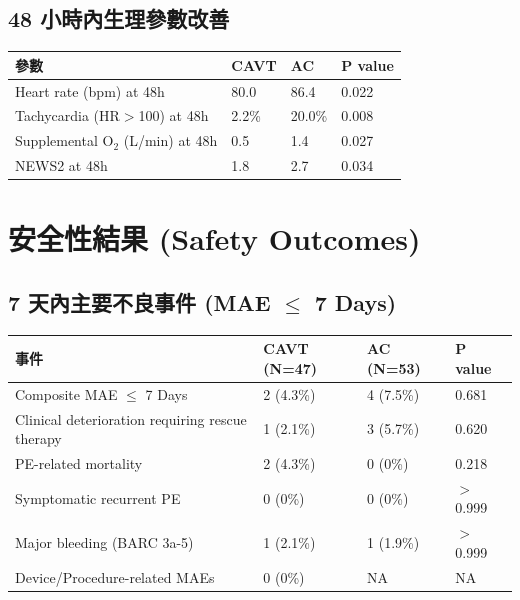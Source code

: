\documentclass[11pt,a4paper]{article}
\begin{document}
\subsection{48 小時內生理參數改善}

\begin{longtable}{p{5cm}p{3cm}p{3cm}p{2.5cm}}
\toprule
\textbf{參數} & \textbf{CAVT} & \textbf{AC} & \textbf{P value} \\
\midrule
\endfirsthead
\bottomrule
\endfoot
Heart rate (bpm) at 48h & 80.0 & 86.4 & 0.022 \\
\midrule
Tachycardia (HR$>$100) at 48h & 2.2\% & 20.0\% & 0.008 \\
\midrule
Supplemental O$_2$ (L/min) at 48h & 0.5 & 1.4 & 0.027 \\
\midrule
NEWS2 at 48h & 1.8 & 2.7 & 0.034 \\
\bottomrule
\end{longtable}

\section{安全性結果 (Safety Outcomes)}

\subsection{7 天內主要不良事件 (MAE $\leq$ 7 Days)}

\begin{longtable}{p{6cm}p{3cm}p{3cm}p{2cm}}
\toprule
\textbf{事件} & \textbf{CAVT (N=47)} & \textbf{AC (N=53)} & \textbf{P value} \\
\midrule
\endfirsthead
\bottomrule
\endfoot
Composite MAE $\leq$ 7 Days & 2 (4.3\%) & 4 (7.5\%) & 0.681 \\
\midrule
Clinical deterioration requiring rescue therapy & 1 (2.1\%) & 3 (5.7\%) & 0.620 \\
\midrule
PE-related mortality & 2 (4.3\%) & 0 (0\%) & 0.218 \\
\midrule
Symptomatic recurrent PE & 0 (0\%) & 0 (0\%) & $>$ 0.999 \\
\midrule
Major bleeding (BARC 3a-5) & 1 (2.1\%) & 1 (1.9\%) & $>$ 0.999 \\
\midrule
Device/Procedure-related MAEs & 0 (0\%) & NA & NA \\
\bottomrule
\end{longtable}

\end{document}
